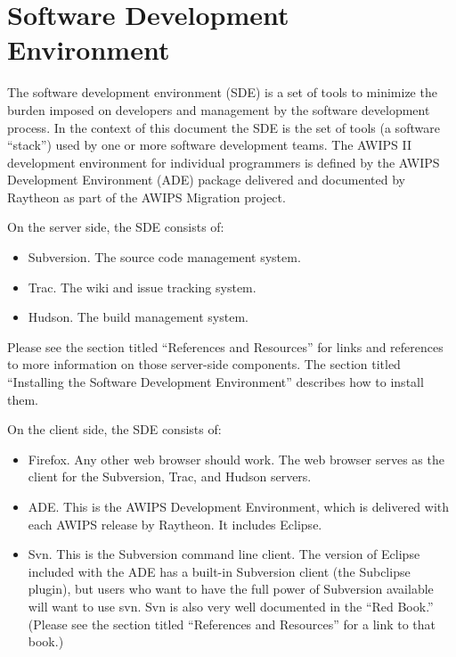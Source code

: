 
\chapter{Software Development Environment}

The software development environment (SDE) is a set of tools to 
minimize the burden imposed on developers and management by 
the software development process.  In the context of this 
document the SDE is the set of 
tools (a software ``stack'') used by one or more software 
development teams.  The AWIPS II development environment for 
individual programmers is defined by the AWIPS Development 
Environment (ADE) package delivered and documented by Raytheon 
as part of the AWIPS Migration project.

On the server side, the SDE consists of:
\begin{itemize}
\item
Subversion.  The source code management system.
\item
Trac.  The wiki and issue tracking system.
\item
Hudson.  The build management system.
\end{itemize}

Please see the section titled ``References and Resources''
for links and references to more information on those 
server-side components.  The section titled
``Installing the Software Development Environment''
describes how to install them.

On the client side, the SDE consists of:
\begin{itemize}
\item
Firefox.  Any other web browser should work.  The web
browser serves as the client for the Subversion, Trac, and
Hudson servers.
\item
ADE.  This is the AWIPS Development Environment, which is
delivered with each AWIPS release by Raytheon.  It includes
Eclipse.
\item
Svn.  This is the Subversion command line client.  The
version of Eclipse included with the ADE has a built-in
Subversion client (the Subclipse plugin), but users who want
to have the full power of Subversion available will want to
use svn.  Svn is also very well documented in the ``Red
Book.''  (Please see the section titled ``References and
Resources'' for a link to that book.)
\end{itemize}







